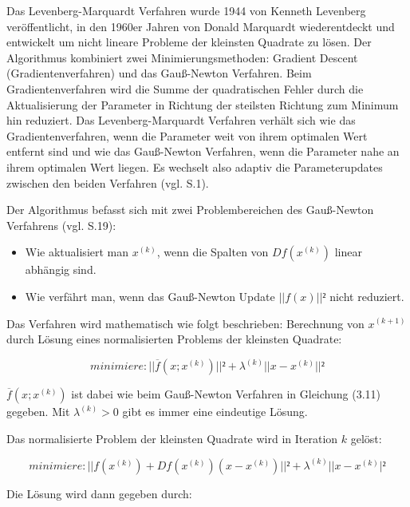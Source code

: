 Das Levenberg-Marquardt Verfahren wurde 1944 von Kenneth Levenberg \cite{levenberg} veröffentlicht, in den 1960er Jahren von Donald Marquardt wiederentdeckt und entwickelt um nicht lineare Probleme der kleinsten Quadrate zu lösen. Der Algorithmus kombiniert zwei Minimierungsmethoden: \glqq Gradient Descent\grqq{} (Gradientenverfahren) und das Gauß-Newton Verfahren. Beim Gradientenverfahren wird die Summe der quadratischen Fehler durch die Aktualisierung der Parameter in Richtung der steilsten Richtung zum Minimum hin reduziert. Das Levenberg-Marquardt Verfahren verhält sich wie das Gradientenverfahren, wenn die Parameter weit von ihrem optimalen Wert entfernt sind und wie das Gauß-Newton Verfahren, wenn die Parameter nahe an ihrem optimalen Wert liegen. Es wechselt also adaptiv die Parameterupdates zwischen den beiden Verfahren (vgl. \cite{lev_mar} S.1).

Der Algorithmus befasst sich mit zwei Problembereichen des Gauß-Newton Verfahrens (vgl. \cite{nonlinear_1} S.19):\\

\begin{itemize}
\item Wie aktualisiert man $x^{(k)}$, wenn die Spalten von $Df(x^{(k)})$ linear abhängig sind.

\item Wie verfährt man, wenn das Gauß-Newton Update $||f(x)||²$ nicht reduziert.\\
\end{itemize}

Das Verfahren wird mathematisch wie folgt beschrieben: Berechnung von $x^{(k+1)}$ durch Lösung eines normalisierten Problems der kleinsten Quadrate:

\begin{equation}
minimiere: ||\overline{f}(x;x^{(k)})||² + \lambda^{(k)}||x-x^{(k)}||²
\end{equation}

$\overline{f}(x;x^{(k)})$ ist dabei wie beim Gauß-Newton Verfahren in Gleichung (3.11) gegeben. Mit $\lambda^{(k)} > 0$ gibt es immer eine eindeutige Lösung.

Das normalisierte Problem der kleinsten Quadrate wird in Iteration $k$ gelöst:

\begin{equation}
minimiere: ||f(x^{(k)}) + Df(x^{(k)})(x-x^{(k)})||² + \lambda^{(k)}||x-x^{(k)}|²
\end{equation}

Die Lösung wird dann gegeben durch:

